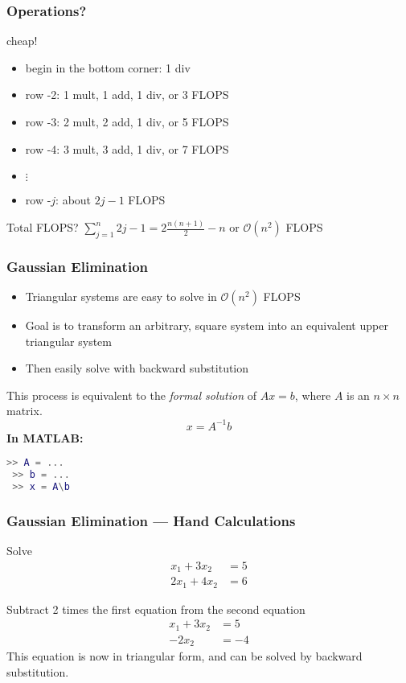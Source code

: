 \documentclass[10pt]{beamer}
\newcommand{\mO}{{\mathcal{O}}}
\newcommand{\matdim}[2]{\ensuremath{#1\times#2}}
\begin{document}
\begin{frame}
\frametitle{Operations?}
\begin{block}{cheap!}
  \begin{itemize}
    \item begin in the bottom corner: 1 div
    \item row -2: 1 mult, 1 add, 1 div, or 3 FLOPS
    \item row -3: 2 mult, 2 add, 1 div, or 5 FLOPS
    \item row -4: 3 mult, 3 add, 1 div, or 7 FLOPS
    \item $\vdots$
    \item row -$j$: about $2j-1$ FLOPS
  \end{itemize}
  Total FLOPS? $\sum_{j=1}^{n} 2j-1 = 2 \frac{ n(n+1)}{2}-n$ or $\mO(n^2)$ FLOPS
\end{block}
\end{frame}
\begin{frame}[fragile]
\frametitle{Gaussian Elimination}
\begin{itemize}
    \item Triangular systems are easy to solve in $\mO(n^2)$ FLOPS
    \item Goal is to transform an arbitrary, square system into an
          equivalent upper triangular system
    \item Then easily solve with backward substitution
\end{itemize}
\vspace{1.0cm}
This process is equivalent to the \emph{formal solution} of 
$Ax=b$, where $A$ is an \matdim{n}{n} matrix.
 \begin{equation*}
         x = A^{-1}b
 \end{equation*}
 \textbf{In MATLAB:}
 \begin{lstlisting}[language=matlab]
 >> A = ...
 >> b = ...
 >> x = A\b
 \end{lstlisting}


\end{frame}
\begin{frame}
\frametitle{Gaussian Elimination --- Hand Calculations}

Solve
\begin{align*}
      x_1 + 3x_2 &= 5\\
    2 x_1 + 4x_2 &= 6
\end{align*}

Subtract 2 times the first equation from the second equation
\begin{align*}
      x_1 + 3x_2 &= 5\\
          - 2x_2 &= -4
\end{align*}
This equation is now in triangular form, and can be solved by
backward substitution.

\end{frame}
\end{document}
